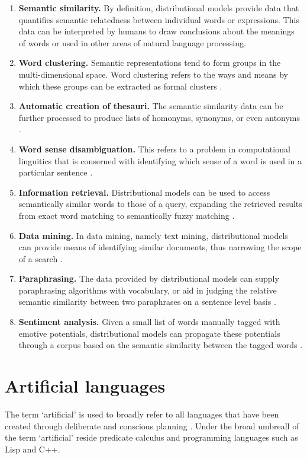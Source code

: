 \documentclass[14pt, a4paper]{extreport}
\begin{document}
\begin{enumerate}
  \item \textbf{Semantic similarity.} By definition, distributional models provide data that quantifies semantic relatedness between individual words or expressions. This data can be interpreted by humans to draw conclusions about the meanings of words or used in other areas of natural language processing.
  \item \textbf{Word clustering.} Semantic representations tend to form groups in the multi-dimensional space. Word clustering refers to the ways and means by which these groups can be extracted as formal clusters \parencite{bekkerman}.
  \item \textbf{Automatic creation of thesauri.} The semantic similarity data can be further processed to produce lists of homonyms, synonyms, or even antonyms \parencite{henestroza}.
  \item \textbf{Word sense disambiguation.} This refers to a problem in computational linguitics that is conserned with identifying which sense of a word is used in a particular sentence \parencite{musto}.
  \item \textbf{Information retrieval.} Distributional models can be used to access semantically similar words to those of a query, expanding the retrieved results from exact word matching to semantically fuzzy matching \parencite{silva}.
  \item \textbf{Data mining.} In data mining, namely text mining, distributional models can provide means of identifying similar documents, thus narrowing the scope of a search \parencite[89]{dalianis}.
  \item \textbf{Paraphrasing.} The data provided by distributional models can supply paraphrasing algorithms with vocabulary, or aid in judging the relative semantic similarity between two paraphrases on a sentence level basis \parencite{desouki}.
  \item \textbf{Sentiment analysis.} Given a small list of words manually tagged with emotive potentials, distributional models can propagate these potentials through a corpus based on the semantic similarity between the tagged words \parencite{alshari}.
\end{enumerate}

  \section{Artificial languages}
The term `artificial' is used to broadly refer to all languages that have been created through deliberate and conscious planning \parencite[41]{stria}. Under the broad umbreall of the term `artificial' reside predicate calculus and programming languages such as Lisp and C++.
\end{document}
